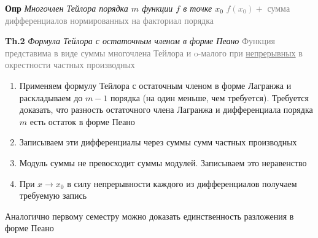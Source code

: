 \textbf{Опр} \textit{Многочлен Тейлора порядка $m$ функции $f$ в точке $x_0$}
\textcolor{gray}{$f(x_0) +$ сумма дифференциалов нормированных на факториал порядка}

\textbf{Th.2} \textit{Формула Тейлора с остаточным членом в форме Пеано}
\textcolor{gray}{Функция представима в виде суммы многочлена Тейлора и o-малого при \underline{непрерывных} в
окрестности частных производных}

\begin{enumerate}
    \item Применяем формулу Тейлора с остаточным членом в форме Лагранжа и раскладываем до $m-1$ порядка
    (на один меньше, чем требуется).
    Требуется доказать, что разность остаточного члена Лагранжа и дифференциала порядка $m$ есть остаток в форме Пеано
    \item Записываем эти дифференциалы через суммы сумм частных производных
    \item Модуль суммы не превосходит суммы модулей.
    Записываем это неравенство
    \item При $x \rightarrow x_0 $ в силу непрерывности каждого из дифференциалов получаем требуемую запись
\end{enumerate}

Аналогично первому семестру можно доказать единственность разложения в форме Пеано